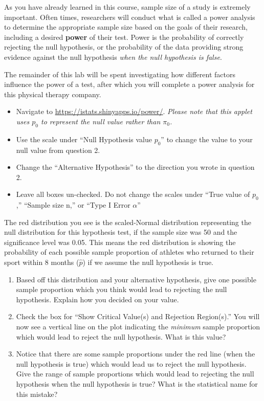 \documentclass[
]{report}
\begin{document}
As you have already learned in this course, sample size of a study is extremely important. Often times, researchers will conduct what is called a power analysis to determine the appropriate sample size based on the goals of their research, including a desired \textbf{power} of their test. Power is the probability of correctly rejecting the null hypothesis, or the probability of the data providing strong evidence against the null hypothesis \emph{when the null hypothesis is false}.

The remainder of this lab will be spent investigating how different factors influence the power of a test, after which you will complete a power analysis for this physical therapy company.

\begin{itemize}
\item
  Navigate to \url{https://istats.shinyapps.io/power/}. \emph{Please note that this applet uses \(p_0\) to represent the null value rather than \(\pi_0\).}
\item
  Use the scale under ``Null Hypothesis value \(p_0\)'' to change the value to your null value from question 2.
\item
  Change the ``Alternative Hypothesis'' to the direction you wrote in question 2.
\item
  Leave all boxes un-checked. Do not change the scales under ``True value of \(p_0\),'' ``Sample size n,'' or ``Type I Error \(\alpha\)''
\end{itemize}

The red distribution you see is the scaled-Normal distribution representing the null distribution for this hypothesis test, if the sample size was 50 and the significance level was 0.05. This means the red distribution is showing the probability of each possible sample proportion of athletes who returned to their sport within 8 months (\(\hat{p}\)) if we assume the null hypothesis is true.

\begin{enumerate}
\def\labelenumi{\arabic{enumi}.}
\setcounter{enumi}{2}
\item
  Based off this distribution and your alternative hypothesis, give one possible sample proportion which you think would lead to rejecting the null hypothesis. Explain how you decided on your value.
  \vspace{0.25in}
\item
  Check the box for ``Show Critical Value(s) and Rejection Region(s).'' You will now see a vertical line on the plot indicating the \emph{minimum} sample proportion which would lead to reject the null hypothesis. What is this value?\\
  \vspace{0.25in}
\item
  Notice that there are some sample proportions under the red line (when the null hypothesis is true) which would lead us to reject the null hypothesis. Give the range of sample proportions which would lead to rejecting the null hypothesis when the null hypothesis is true? What is the statistical name for this mistake?
  \vspace{0.4in}
\end{enumerate}
\end{document}
